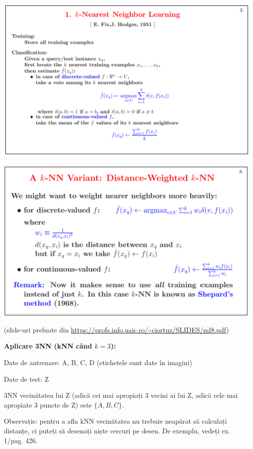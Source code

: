 \documentclass[12pt]{article}
\begin{document}
	\begin{center}
		\includegraphics[width=1\linewidth]{screenshot004}
	\end{center}
	\begin{center}
		\includegraphics[width=1\linewidth]{screenshot005}
	\end{center}
	(slide-uri preluate din \url{https://profs.info.uaic.ro/~ciortuz/SLIDES/ml8.pdf})
	
\textbf{	Aplicare 3NN (kNN când $k=3$):}
	
	Date de antrenare: A, B, C, D (etichetele sunt date în imagini)
	
	Date de test: Z
	
	3NN vecinătatea lui Z (adică cei mai apropiați 3 vecini ai lui Z, adică cele mai apropiate 3 puncte de Z) este $\{A,B,C\}$.
	
	Observație: pentru a afla kNN vecinătatea nu trebuie neapărat să calculați distanțe, ci puteți să desenați niște cercuri pe desen. De exemplu, vedeți ex. 1/pag. 426.
	
\end{document}
